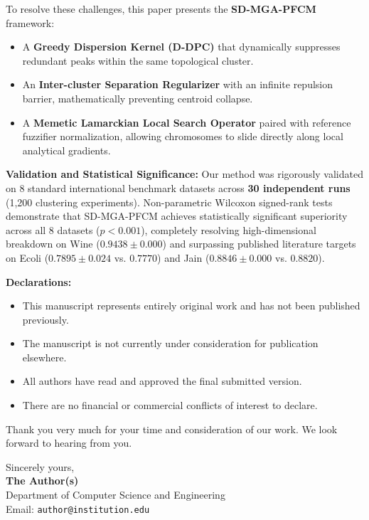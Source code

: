 \documentclass[11pt]{article}
\begin{document}
\noindent To resolve these challenges, this paper presents the \textbf{SD-MGA-PFCM} framework:
\begin{itemize}
    \item A \textbf{Greedy Dispersion Kernel (D-DPC)} that dynamically suppresses redundant peaks within the same topological cluster.
    \item An \textbf{Inter-cluster Separation Regularizer} with an infinite repulsion barrier, mathematically preventing centroid collapse.
    \item A \textbf{Memetic Lamarckian Local Search Operator} paired with reference fuzzifier normalization, allowing chromosomes to slide directly along local analytical gradients.
\end{itemize}

\noindent \textbf{Validation and Statistical Significance:}
Our method was rigorously validated on 8 standard international benchmark datasets across \textbf{30 independent runs} (1,200 clustering experiments). Non-parametric Wilcoxon signed-rank tests demonstrate that SD-MGA-PFCM achieves statistically significant superiority across all 8 datasets ($p < 0.001$), completely resolving high-dimensional breakdown on Wine ($0.9438 \pm 0.000$) and surpassing published literature targets on Ecoli ($0.7895 \pm 0.024$ vs. $0.7770$) and Jain ($0.8846 \pm 0.000$ vs. $0.8820$).

\vspace{1em}

\noindent \textbf{Declarations:}
\begin{itemize}
    \item This manuscript represents entirely original work and has not been published previously.
    \item The manuscript is not currently under consideration for publication elsewhere.
    \item All authors have read and approved the final submitted version.
    \item There are no financial or commercial conflicts of interest to declare.
\end{itemize}

\vspace{1.5em}

\noindent Thank you very much for your time and consideration of our work. We look forward to hearing from you.

\vspace{2em}

\noindent Sincerely yours,\\
\textbf{The Author(s)}\\
Department of Computer Science and Engineering\\
Email: \texttt{author@institution.edu}
\end{document}
